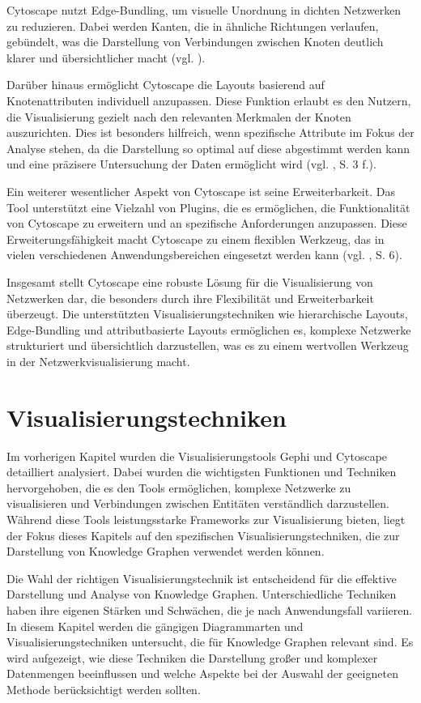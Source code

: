 Cytoscape nutzt Edge-Bundling, um visuelle Unordnung in dichten Netzwerken zu reduzieren. Dabei werden Kanten, die in ähnliche Richtungen verlaufen, gebündelt, was die Darstellung von Verbindungen zwischen Knoten deutlich klarer und übersichtlicher macht (vgl. \cite{cytoscapeLayout:Cytoscape}).

Darüber hinaus ermöglicht Cytoscape die Layouts basierend auf Knotenattributen individuell anzupassen. Diese Funktion erlaubt es den Nutzern, die Visualisierung gezielt nach den relevanten Merkmalen der Knoten auszurichten. Dies ist besonders hilfreich, wenn spezifische Attribute im Fokus der Analyse stehen, da die Darstellung so optimal auf diese abgestimmt werden kann und eine präzisere Untersuchung der Daten ermöglicht wird (vgl. \cite{cytoscape:Shannon}, S. 3 f.).

Ein weiterer wesentlicher Aspekt von Cytoscape ist seine Erweiterbarkeit. Das Tool unterstützt eine Vielzahl von Plugins, die es ermöglichen, die Funktionalität von Cytoscape zu erweitern und an spezifische Anforderungen anzupassen. Diese Erweiterungsfähigkeit macht Cytoscape zu einem flexiblen Werkzeug, das in vielen verschiedenen Anwendungsbereichen eingesetzt werden kann (vgl. \cite{cytoscape:Shannon}, S. 6).

Insgesamt stellt Cytoscape eine robuste Lösung für die Visualisierung von Netzwerken dar, die besonders durch ihre Flexibilität und Erweiterbarkeit überzeugt. Die unterstützten Visualisierungstechniken wie hierarchische Layouts, Edge-Bundling und attributbasierte Layouts ermöglichen es, komplexe Netzwerke strukturiert und übersichtlich darzustellen, was es zu einem wertvollen Werkzeug in der Netzwerkvisualisierung macht.

\section{Visualisierungstechniken}
\label{theory:vistechniques}

Im vorherigen Kapitel wurden die Visualisierungstools Gephi und Cytoscape detailliert analysiert. Dabei wurden die wichtigsten Funktionen und Techniken hervorgehoben, die es den Tools ermöglichen, komplexe Netzwerke zu visualisieren und Verbindungen zwischen Entitäten verständlich darzustellen. Während diese Tools leistungsstarke Frameworks zur Visualisierung bieten, liegt der Fokus dieses Kapitels auf den spezifischen Visualisierungstechniken, die zur Darstellung von Knowledge Graphen verwendet werden können.

Die Wahl der richtigen Visualisierungstechnik ist entscheidend für die effektive Darstellung und Analyse von Knowledge Graphen. Unterschiedliche Techniken haben ihre eigenen Stärken und Schwächen, die je nach Anwendungsfall variieren. In diesem Kapitel werden die gängigen Diagrammarten und Visualisierungstechniken untersucht, die für Knowledge Graphen relevant sind. Es wird aufgezeigt, wie diese Techniken die Darstellung großer und komplexer Datenmengen beeinflussen und welche Aspekte bei der Auswahl der geeigneten Methode berücksichtigt werden sollten.

